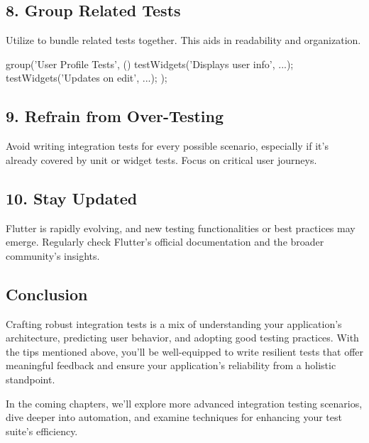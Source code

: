 \subsection*{8. Group Related Tests}

Utilize  to bundle related tests together. This aids in readability and organization.

\begin{dartcode}
group('User Profile Tests', () {
  testWidgets('Displays user info', ...);
  testWidgets('Updates on edit', ...);
});
\end{dartcode}

\subsection*{9. Refrain from Over-Testing}

Avoid writing integration tests for every possible scenario, especially if it's already covered by unit or widget tests.
Focus on critical user journeys.

\subsection*{10. Stay Updated}

Flutter is rapidly evolving, and new testing functionalities or best practices may emerge. 
Regularly check Flutter's official documentation and the broader community's insights.

\subsection*{Conclusion}

Crafting robust integration tests is a mix of understanding your application's architecture, predicting user behavior, and adopting good testing practices. 
With the tips mentioned above, you'll be well-equipped to write resilient tests that offer meaningful feedback and ensure your application's reliability from a holistic standpoint.

In the coming chapters, we'll explore more advanced integration testing scenarios, dive deeper into automation, and examine techniques for enhancing your test suite's efficiency.





